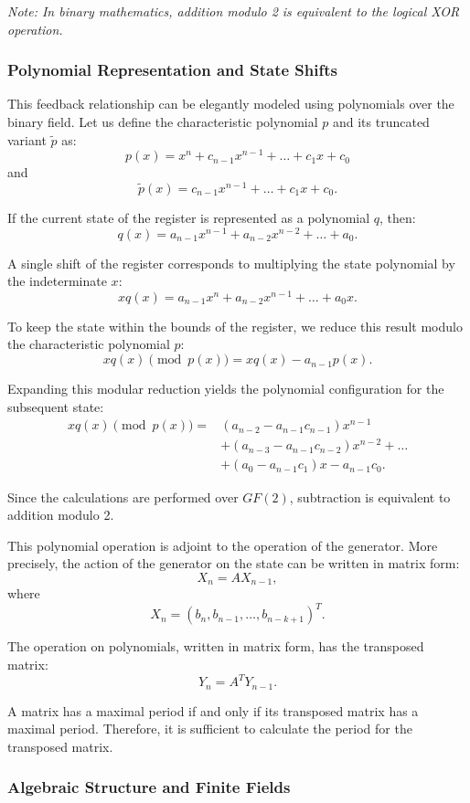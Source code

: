 \textit{Note: In binary mathematics, addition modulo 2 is equivalent to the logical XOR operation.}

\subsubsection{Polynomial Representation and State Shifts}

This feedback relationship can be elegantly modeled using polynomials over the binary field. Let us define the characteristic polynomial $p$ and its truncated variant $\tilde{p}$ as:
\[
p(x)=x^n+c_{n-1}x^{n-1}+\dots+c_1x+c_0
\]
and
\[
\tilde{p}(x)=c_{n-1}x^{n-1}+\dots+c_1x+c_0.
\]

If the current state of the register is represented as a polynomial $q$, then:
\[
q(x)=a_{n-1}x^{n-1}+a_{n-2}x^{n-2}+\dots+a_0.
\]

A single shift of the register corresponds to multiplying the state polynomial by the indeterminate $x$:
\[
xq(x)=a_{n-1}x^n+a_{n-2}x^{n-1}+\dots+a_0x.
\]

To keep the state within the bounds of the register, we reduce this result modulo the characteristic polynomial $p$:
\[
xq(x)\pmod{p(x)}=xq(x)-a_{n-1}p(x).
\]

Expanding this modular reduction yields the polynomial configuration for the subsequent state:
\[
\begin{aligned}
xq(x)\pmod{p(x)}
={}&(a_{n-2}-a_{n-1}c_{n-1})x^{n-1}\\
&+(a_{n-3}-a_{n-1}c_{n-2})x^{n-2}
+\dots\\
&+(a_0-a_{n-1}c_1)x-a_{n-1}c_0.
\end{aligned}
\]

Since the calculations are performed over $GF(2)$, subtraction is equivalent to addition modulo 2.

This polynomial operation is adjoint to the operation of the generator. More precisely, the action of the generator on the state can be written in matrix form:
\[
X_n=AX_{n-1},
\]
where
\[
X_n=(b_n,b_{n-1},\dots,b_{n-k+1})^T.
\]

The operation on polynomials, written in matrix form, has the transposed matrix:
\[
Y_n=A^TY_{n-1}.
\]

A matrix has a maximal period if and only if its transposed matrix has a maximal period. Therefore, it is sufficient to calculate the period for the transposed matrix.

\subsubsection{Algebraic Structure and Finite Fields}

